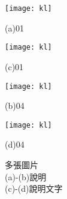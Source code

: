 \begin{figure}[p]
	\begin{minipage}{0.5\textwidth}  %
		\centerline{\texttt{[image: kl]}}
		\centerline{(a)01}
	\end{minipage}
	\hfill
	\begin{minipage}{0.5\textwidth}  %
		\centerline{\texttt{[image: kl]}}
		\centerline{(c)01}
	\end{minipage}
	\vfill
	\begin{minipage}{0.5\textwidth}  %
		\centerline{\texttt{[image: kl]}}
		\centerline{(b)04}
	\end{minipage}
	\hfill
	\begin{minipage}{0.5\textwidth}  %
		\centerline{\texttt{[image: kl]}}
		\centerline{(d)04}
	\end{minipage}
	\captionsetup{justification=centering}
	\caption[多張圖片]{多張圖片\\ (a)-(b)說明 \\ (c)-(d)說明文字}
	\label{fig:exp_own_acc}
\end{figure}
